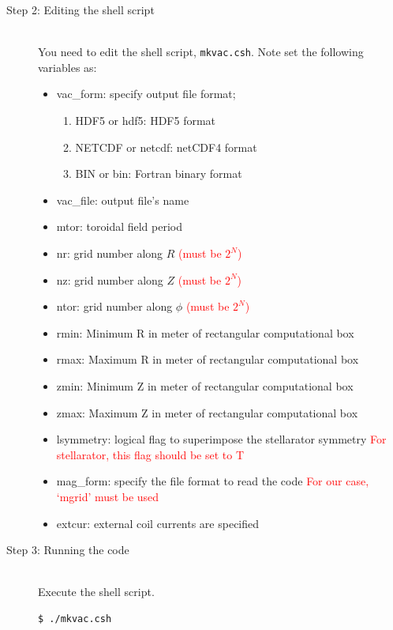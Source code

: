 \documentclass[10pt]{ltxdoc} %
\begin{document}
\begin{description}
 \item[Step 2: Editing the shell script]\mbox{}\\
  You need to edit the shell script, \texttt{mkvac.csh}. Note set the following variables as:
   \begin{itemize}
    \item vac\_form: specify output file format;
     \begin{enumerate}
      \item HDF5 or hdf5: HDF5 format
      \item NETCDF or netcdf: netCDF4 format
      \item BIN or bin: Fortran binary format
     \end{enumerate}
    \item vac\_file: output file's name
    \item mtor: toroidal field period
    \item nr: grid number along $R$ \textcolor{red}{(must be $2^N$)}
    \item nz: grid number along $Z$ \textcolor{red}{(must be $2^N$)}
    \item ntor: grid number along $\phi$ \textcolor{red}{(must be $2^N$)}
    \item rmin: Minimum R in meter of rectangular computational box
    \item rmax: Maximum R in meter of rectangular computational box
    \item zmin: Minimum Z in meter of rectangular computational box
    \item zmax: Maximum Z in meter of rectangular computational box
    \item lsymmetry: logical flag to superimpose the stellarator symmetry \textcolor{red}{For stellarator, this flag should be set to T}
    \item mag\_form: specify the file format to read the code \textcolor{red}{For our case, `mgrid' must be used}
    \item extcur: external coil currents are specified
   \end{itemize}

 \item[Step 3: Running the code]\mbox{}\\
  Execute the shell script.
\vspace{-2mm}
\begin{verbatim}
$ ./mkvac.csh
\end{verbatim}
\vspace{-2mm}
\end{description}
\end{document}
